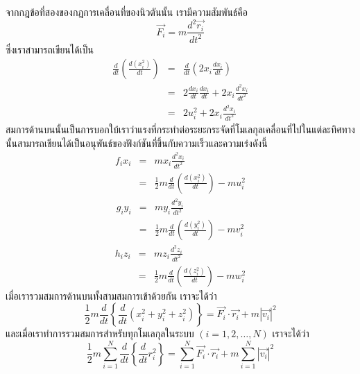 จากกฎข้อที่สองของกฎการเคลื่อนที่ของนิวตันนั้น เรามีความสัมพันธ์คือ
%
\begin{equation}
    \vec{F_i}
    =
    m\frac{d^2\vec{r_i}}{dt^2}
\end{equation}
%
ซึ่งเราสามารถเขียนได้เป็น
%
\begin{eqnarray}
    \frac d{dt}\left(\frac{d\left(x_i^2\right)}{dt}\right)
    & = & \frac{d}{dt}
    \left( 2x_i\frac{dx_i}{dt}\right) \\
    & = & 2\frac{dx_i}{dt}\frac{dx_i}{dt} + 2x_i\frac{d^2x_i}{dt^2} \\
    & = & 2u_i^2 + 2x_i\frac{d^2x_i}{dt^2}
\end{eqnarray}
%
สมการด้านบนนั้นเป็นการบอกใบ้เราว่าแรงที่กระทำต่อระยะกระจัดที่โมเลกุลเคลื่อนที่ไปในแต่ละทิศทางนั้นสามารถเขียนได้เป็นอนุพันธ์ของฟังก์ชันที่ขึ้นกับความเร็วและความเร่งดังนี้
%
\begin{eqnarray}
    f_ix_i & = & mx_i \frac{d^2x_i}{dt^2} \\
    & = & \frac{1}{2} m \frac{d}{dt}\left(\frac{d\left( x_i^2\right)}{dt}\right) - mu_i^2
\end{eqnarray}
%
\begin{eqnarray}
    g_iy_i & = & my_i \frac{d^2y_i}{dt^2} \\
    & = & \frac{1}{2} m \frac d{dt}\left(\frac{d\left( y_i^2\right)}{dt}\right) - mv_i^2
\end{eqnarray}
%
\begin{eqnarray}
    h_iz_i & = & mz_i \frac{d^2z_i}{dt^2} \\
    & = &\frac{1}{2} m \frac{d}{dt}\left(\frac{d\left( z_i^2\right)}{dt}\right) -mw_i^2
\end{eqnarray}
%
เมื่อเรารวมสมการด้านบนทั้งสามสมการเข้าด้วยกัน เราจะได้ว่า
%
\begin{equation}
    \frac{1}{2} m \frac{d}{dt}\left\{ \frac d{dt}\left( x_i^2+y_i^2+z_i^2\right)
    \right\} = \vec{F_i} \cdot \vec{r_i}+m\left| \vec{v_i}\right|^2
\end{equation}
%
และเมื่อเราทำการรวมสมการสำหรับทุกโมเลกุลในระบบ $(i = 1, 2, \dots, N)$ เราจะได้ว่า
%
\begin{equation}
    \label{eq:eoq_system}
    \frac{1}{2} m \sum_{i=1}^{N} \frac d{dt}\left\{\frac d{dt}r_i^2\right\}
    =
    \sum_{i=1}^{N} \vec{F_i}\cdot \vec{r_i}+m\sum_{i=1}^{N} \left| \vec{v_i}\right|^2
\end{equation}


